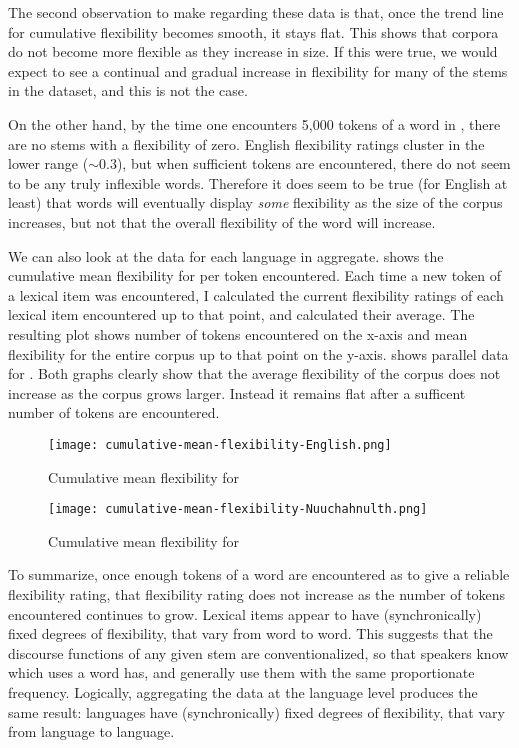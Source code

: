 The second observation to make regarding these data is that, once the trend line for cumulative flexibility becomes smooth, it stays flat. This shows that corpora do not become more flexible as they increase in size. If this were true, we would expect to see a continual and gradual increase in flexibility for many of the stems in the dataset, and this is not the case.

On the other hand, by the time one encounters 5,000 tokens of a word in , there are no stems with a flexibility of zero. English flexibility ratings cluster in the lower range ($\sim0.3$), but when sufficient tokens are encountered, there do not seem to be any truly inflexible words. Therefore it does seem to be true (for English at least) that words will eventually display \emph{some} flexibility as the size of the corpus increases, but not that the overall flexibility of the word will increase.

We can also look at the data for each language in aggregate.  shows the cumulative mean flexibility for  per token encountered. Each time a new token of a lexical item was encountered, I calculated the current flexibility ratings of each lexical item encountered up to that point, and calculated their average. The resulting plot shows number of tokens encountered on the x-axis and mean flexibility for the entire corpus up to that point on the y-axis.  shows parallel data for . Both graphs clearly show that the average flexibility of the corpus does not increase as the corpus grows larger. Instead it remains flat after a sufficent number of tokens are encountered.

\begin{figure}[h!]
  \centering
  \caption{Cumulative mean flexibility for }
  \label{fig:cumulative-mean-flexibility-English}
  \texttt{[image: cumulative-mean-flexibility-English.png]}
\end{figure}

\begin{figure}[h!]
  \centering
  \caption{Cumulative mean flexibility for }
  \label{fig:cumulative-mean-flexibility-Nuuchahnulth}
  \texttt{[image: cumulative-mean-flexibility-Nuuchahnulth.png]}
\end{figure}

To summarize, once enough tokens of a word are encountered as to give a reliable flexibility rating, that flexibility rating does not increase as the number of tokens encountered continues to grow. Lexical items appear to have (synchronically) fixed degrees of flexibility, that vary from word to word. This suggests that the discourse functions of any given stem are conventionalized, so that speakers know which uses a word has, and generally use them with the same proportionate frequency. Logically, aggregating the data at the language level produces the same result: languages have (synchronically) fixed degrees of flexibility, that vary from language to language.

